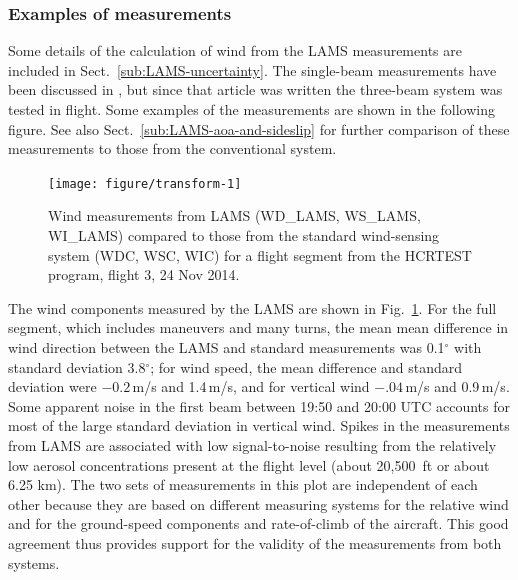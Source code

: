 \documentclass[12pt,twoside,english]{article}\usepackage[]{graphicx}\usepackage[]{color}
\newenvironment{knitrout}{}{} %
\begin{document}
\subsubsection{Examples of measurements\label{sub:LAMS-examples}}

Some details of the calculation of wind from the LAMS measurements are included in Sect.~\ref{sub:LAMS-uncertainty}. The single-beam measurements have been discussed in \citet{CooperEtAl2014}, but since that article was written the three-beam system was tested in flight. Some examples of the measurements are shown in the following figure. See also Sect.~\ref{sub:LAMS-aoa-and-sideslip} for further comparison of these measurements to those from the conventional system.



\begin{knitrout}
\color{fgcolor}\begin{figure}
\texttt{[image: figure/transform-1]} \caption[Wind measurements from LAMS (WD\_LAMS, WS\_LAMS, WI\_LAMS) compared to those from the standard wind-sensing system (WDC, WSC, WIC) for a flight segment from the HCRTEST program, flight 3, 24 Nov 2014]{Wind measurements from LAMS (WD\_LAMS, WS\_LAMS, WI\_LAMS) compared to those from the standard wind-sensing system (WDC, WSC, WIC) for a flight segment from the HCRTEST program, flight 3, 24 Nov 2014.}\label{fig:transform}
\end{figure}


\end{knitrout}

The wind components measured by the LAMS are shown in Fig.~\ref{fig:transform}. For the full segment, which includes maneuvers and many turns, the mean mean difference in wind direction between the LAMS and standard measurements was 0.1$^{\circ}$ with standard deviation 3.8$^{\circ}$; for wind speed, the mean difference and standard deviation were $-0.2$\,m/s and 1.4\,m/s, and for vertical wind $-.04$\,m/s and 0.9\,m/s. Some apparent
noise in the first beam between 19:50 and 20:00 UTC accounts for most of the large
standard deviation in vertical wind. Spikes in the measurements from LAMS are associated with low signal-to-noise resulting from the relatively low aerosol concentrations present at the flight level (about 20,500~ft or about 6.25 km). The two sets of measurements in this plot are
independent of each other because they are based on different measuring systems for
the relative wind and for the ground-speed components and rate-of-climb of the aircraft.
This good agreement thus provides support for the validity of the measurements from both systems.
\end{document}
